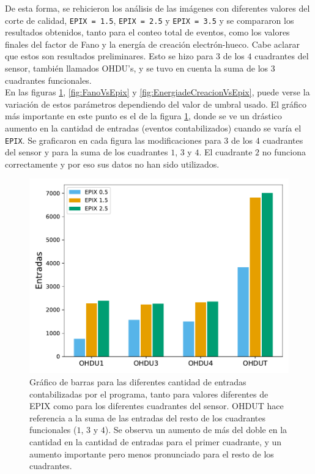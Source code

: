 \indent De esta forma, se rehicieron los análisis de las imágenes con diferentes valores del corte de calidad, \verb|EPIX = 1.5|, \verb|EPIX = 2.5| y \verb|EPIX = 3.5| y se compararon los resultados obtenidos, tanto para el conteo total de eventos, como los valores finales del factor de Fano y la energía de creación electrón-hueco. Cabe aclarar que estos son resultados preliminares. Esto se hizo para $3$ de los $4$ cuadrantes del sensor, también llamados OHDU's, y se tuvo en cuenta la suma de los 3 cuadrantes funcionales.\\
\indent En las figuras \ref{fig:EntradasVsEpix}, \ref{fig:FanoVsEpix} y \ref{fig:EnergiadeCreacionVsEpix},  puede verse la variación de estos parámetros dependiendo del valor de umbral usado. El gráfico más importante en este punto es el de la figura \ref{fig:EntradasVsEpix}, donde se ve un drástico aumento en la cantidad de entradas (eventos contabilizados) cuando se varía el \verb|EPIX|. Se graficaron en cada figura las modificaciones para $3$ de los $4$ cuadrantes del sensor y para la suma de los cuadrantes $1$, $3$ y $4$. El cuadrante $2$ no funciona correctamente y por eso sus datos no han sido utilizados.
\begin{figure}[h]
    \centering
    \includegraphics[scale=0.5]{Figs/Entradas_vs_Epix.pdf}
    \caption{\footnotesize{Gráfico de barras para las diferentes cantidad de entradas contabilizadas por el programa, tanto para valores diferentes de EPIX como para los diferentes cuadrantes del sensor. OHDUT hace referencia a la suma de las entradas del resto de los cuadrantes funcionales ($1$, $3$ y $4$). Se observa un aumento de más del doble en la cantidad en la cantidad de entradas para el primer cuadrante, y un aumento importante pero menos pronunciado para el resto de los cuadrantes.}}
    \label{fig:EntradasVsEpix}
\end{figure}
